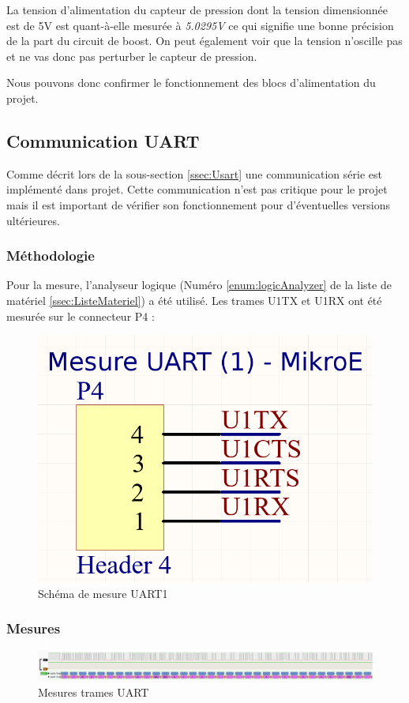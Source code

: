 {	La tension d'alimentation du capteur de pression dont la tension dimensionnée est de 5V est quant-à-elle mesurée à \textit{5.0295V} ce qui signifie une bonne précision de la part du circuit de boost. On peut également voir que la tension n'oscille pas et ne vas donc pas perturber le capteur de pression.
	
	Nous pouvons donc confirmer le fonctionnement des blocs d'alimentation du projet.
	
}

\subsection{Communication UART}
{
	Comme décrit lors de la sous-section \ref{ssec:Usart} une communication série est implémenté dans projet. Cette communication n'est pas critique pour le projet mais il est important de vérifier son fonctionnement pour d'éventuelles versions ultérieures.
	\subsubsection{Méthodologie}
	Pour la mesure, l'analyseur logique (Numéro \ref{enum:logicAnalyzer} de la liste de matériel \ref{ssec:ListeMateriel}) a été utilisé. Les trames U1TX et U1RX ont été mesurée sur le connecteur P4 :
	
	\begin{figure}[h]
		\centering
		\includegraphics[width=0.2\linewidth]{Figures/DEV_MEAS/SchUart1}
		\caption{Schéma de mesure UART1}
		\label{fig:schuart1}
	\end{figure}
	\clearpage	
	\subsubsection{Mesures}
	
	\begin{figure}[h]
		\centering
		\includegraphics[width=1.1\linewidth]{Mesures/MesureTrameUart_Upscaled}
		\caption{Mesures trames UART}
		\label{fig:mesuretrameuart}
	\end{figure}

}
